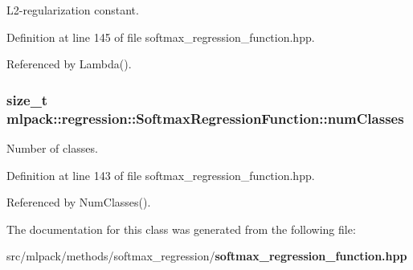 L2-\/regularization constant. 



Definition at line 145 of file softmax\+\_\+regression\+\_\+function.\+hpp.



Referenced by Lambda().

\subsubsection[{num\+Classes}]{\setlength{\rightskip}{0pt plus 5cm}size\+\_\+t mlpack\+::regression\+::\+Softmax\+Regression\+Function\+::num\+Classes\hspace{0.3cm}{\ttfamily [private]}}\label{classmlpack_1_1regression_1_1SoftmaxRegressionFunction_a101ba2df474ecdc8df13a578894812a6}


Number of classes. 



Definition at line 143 of file softmax\+\_\+regression\+\_\+function.\+hpp.



Referenced by Num\+Classes().



The documentation for this class was generated from the following file\+:\begin{DoxyCompactItemize}
\item 
src/mlpack/methods/softmax\+\_\+regression/{\bf softmax\+\_\+regression\+\_\+function.\+hpp}\end{DoxyCompactItemize}
